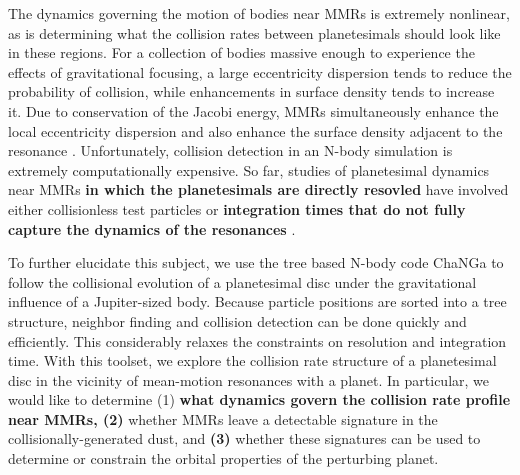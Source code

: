 \documentclass[fleqn,usenatbib]{mnras}
\begin{document}
The dynamics governing the motion of bodies near MMRs is extremely nonlinear, as is determining what the collision rates between planetesimals 
should look like in these regions. For a collection of bodies massive enough to experience the effects of gravitational focusing, a large eccentricity 
dispersion tends to reduce the probability of collision, while enhancements in surface density tends to increase it. Due to conservation of the Jacobi 
energy, MMRs simultaneously enhance the local eccentricity dispersion and also enhance the surface density adjacent to the resonance 
\citep{2000Icar..143...45R, 2017ApJ...850..103B}. Unfortunately, collision detection in an N-body simulation is extremely computationally expensive. 
So far, studies of planetesimal dynamics near MMRs \textbf{in which the planetesimals are directly resovled} have involved either collisionless test particles 
\citep{2017ApJ...850..103B, 2016ApJ...818..159T, 2018ApJ...857....3T} or \textbf{integration times that do not fully capture the dynamics of the resonances} 
\citep{2000Icar..143...45R, 2013ApJ...777L..31D}.

To further elucidate this subject, we use the tree based N-body code {\sc ChaNGa}\citep{2008IEEEpds...ChaNGa, 2015AphCom..2..1}  to follow the 
collisional evolution of a planetesimal disc under the gravitational influence of a Jupiter-sized body. Because particle positions are sorted into a tree 
structure, neighbor finding and collision detection can be done quickly and efficiently. This considerably relaxes the constraints on resolution and 
integration time. With this toolset, we explore the collision rate structure of a planetesimal disc in the vicinity of mean-motion resonances with a planet. In 
particular, we would like to determine (1) \textbf{what dynamics govern the collision rate profile near MMRs, (2)} whether MMRs leave a detectable signature in the
collisionally-generated dust, and \textbf{(3)} whether these signatures can be used to determine or constrain the orbital properties of the perturbing planet.
\end{document}
